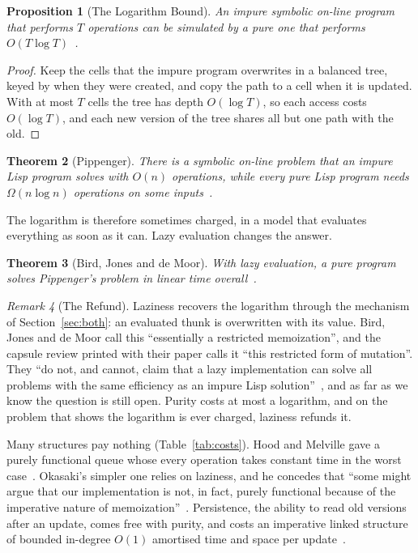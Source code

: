 \documentclass[11pt]{article}
\newtheorem{theorem}{Theorem}[section]
\newtheorem{proposition}[theorem]{Proposition}
\theoremstyle{definition}
\theoremstyle{remark}
\newtheorem{remark}[theorem]{Remark}
\begin{document}
\begin{proposition}[The Logarithm Bound]\label{prop:logbound}
  An impure symbolic on-line program that performs $T$ operations can be
  simulated by a pure one that performs $O(T\log T)$~\cite{pippenger}.
\end{proposition}

\begin{proof}
  Keep the cells that the impure program overwrites in a balanced tree,
  keyed by when they were created, and copy the path to a cell when it is
  updated. With at most $T$ cells the tree has depth $O(\log T)$, so each
  access costs $O(\log T)$, and each new version of the tree shares all
  but one path with the old.
\end{proof}

\begin{theorem}[Pippenger]\label{thm:pippenger}
  There is a symbolic on-line problem that an impure Lisp program solves
  with $O(n)$ operations, while every pure Lisp program needs
  $\Omega(n\log n)$ operations on some inputs~\cite{pippenger}.
\end{theorem}

The logarithm is therefore sometimes charged, in a model that evaluates
everything as soon as it can. Lazy evaluation changes the answer.

\begin{theorem}[Bird, Jones and de Moor]\label{thm:bird}
  With lazy evaluation, a pure program solves Pippenger's problem in
  linear time overall~\cite{bird}.
\end{theorem}

\begin{remark}[The Refund]
  Laziness recovers the logarithm through the mechanism of
  Section~\ref{sec:both}: an evaluated thunk is overwritten with its
  value. Bird, Jones and de Moor call this ``essentially a restricted
  memoization'', and the capsule review printed with their paper calls it
  ``this restricted form of mutation''. They ``do not, and cannot, claim
  that a lazy implementation can solve all problems with the same
  efficiency as an impure Lisp solution''~\cite{bird}, and as far as we
  know the question is still open. Purity costs at most a logarithm, and
  on the problem that shows the logarithm is ever charged, laziness
  refunds it.
\end{remark}

Many structures pay nothing (Table~\ref{tab:costs}).
Hood and Melville gave a purely functional queue whose every operation
takes constant time in the worst case~\cite{hood}. Okasaki's simpler one
relies on laziness, and he concedes that ``some might argue that our
implementation is not, in fact, purely functional because of the
imperative nature of memoization''~\cite{okasaki95}. Persistence, the
ability to read old versions after an update, comes free with purity,
and costs an imperative linked structure of bounded in-degree $O(1)$
amortised time and space per update~\cite{dsst}.
\end{document}
